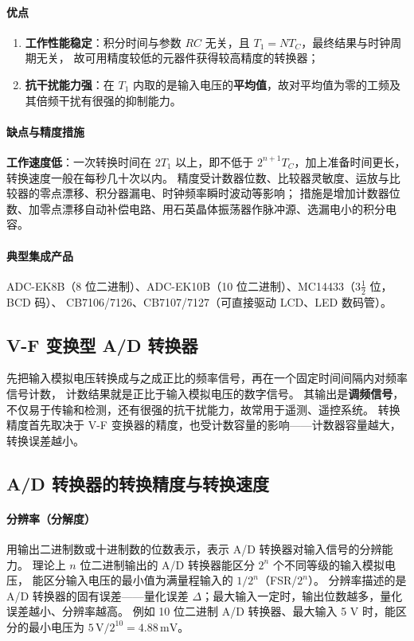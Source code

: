 \paragraph{优点}
\begin{enumerate}
    \item \textbf{工作性能稳定}：积分时间与参数 $RC$ 无关，且 $T_1=NT_C$，最终结果与时钟周期无关，
    故可用精度较低的元器件获得较高精度的转换器；
    \item \textbf{抗干扰能力强}：在 $T_1$ 内取的是输入电压的\textbf{平均值}，故对平均值为零的工频及其倍频干扰有很强的抑制能力。
\end{enumerate}

\paragraph{缺点与精度措施}
\textbf{工作速度低}：一次转换时间在 $2T_1$ 以上，即不低于 $2^{n+1}T_C$，加上准备时间更长，
转换速度一般在每秒几十次以内。
精度受计数器位数、比较器灵敏度、运放与比较器的零点漂移、积分器漏电、时钟频率瞬时波动等影响；
措施是增加计数器位数、加零点漂移自动补偿电路、用石英晶体振荡器作脉冲源、选漏电小的积分电容。

\paragraph{典型集成产品}
ADC-EK8B（8 位二进制）、ADC-EK10B（10 位二进制）、MC14433（$3\frac{1}{2}$ 位，BCD 码）、
CB7106/7126、CB7107/7127（可直接驱动 LCD、LED 数码管）。

\subsection{V-F 变换型 A/D 转换器}
先把输入模拟电压转换成与之成正比的频率信号，再在一个固定时间间隔内对频率信号计数，
计数结果就是正比于输入模拟电压的数字信号。
其输出是\textbf{调频信号}，不仅易于传输和检测，还有很强的抗干扰能力，故常用于遥测、遥控系统。
转换精度首先取决于 V-F 变换器的精度，也受计数容量的影响——计数器容量越大，转换误差越小。

\subsection{A/D 转换器的转换精度与转换速度}
\paragraph{分辨率（分解度）}
用输出二进制数或十进制数的位数表示，表示 A/D 转换器对输入信号的分辨能力。
理论上 $n$ 位二进制输出的 A/D 转换器能区分 $2^n$ 个不同等级的输入模拟电压，
能区分输入电压的最小值为满量程输入的 $1/2^n$（FSR/$2^n$）。
分辨率描述的是 A/D 转换器的固有误差——量化误差 $\Delta$；最大输入一定时，输出位数越多，量化误差越小、分辨率越高。
例如 10 位二进制 A/D 转换器、最大输入 5 V 时，能区分的最小电压为 $5\,\mathrm{V}/2^{10}=4.88\,\mathrm{mV}$。

